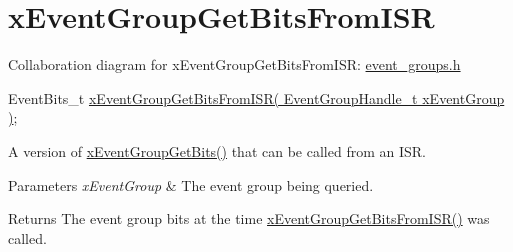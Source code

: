 \hypertarget{group__x_event_group_get_bits_from_i_s_r}{}\section{x\+Event\+Group\+Get\+Bits\+From\+I\+SR}
\label{group__x_event_group_get_bits_from_i_s_r}
Collaboration diagram for x\+Event\+Group\+Get\+Bits\+From\+I\+SR\+:
\hyperlink{event__groups_8h}{event\+\_\+groups.\+h} 
\begin{DoxyPre}
   EventBits\_t \hyperlink{event__groups_8h_a95822db4357d0b77c35aed0c7427eca0}{xEventGroupGetBitsFromISR( EventGroupHandle\_t xEventGroup )};
\end{DoxyPre}


A version of \hyperlink{event__groups_8h_a0ae86f092fb07ccb475ae938f9a12584}{x\+Event\+Group\+Get\+Bits()} that can be called from an I\+SR.


\begin{DoxyParams}{Parameters}
{\em x\+Event\+Group} & The event group being queried.\\
\hline
\end{DoxyParams}
\begin{DoxyReturn}{Returns}
The event group bits at the time \hyperlink{event__groups_8h_a95822db4357d0b77c35aed0c7427eca0}{x\+Event\+Group\+Get\+Bits\+From\+I\+S\+R()} was called. 
\end{DoxyReturn}
